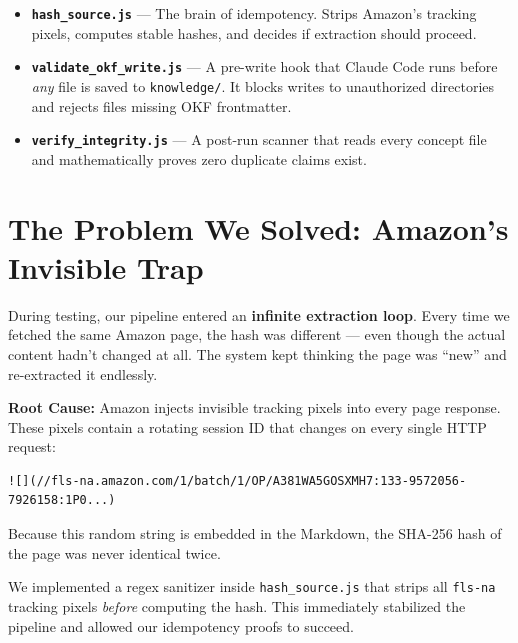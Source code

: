 \documentclass[11pt,a4paper]{article}
\begin{document}
\begin{itemize}[leftmargin=*, label=\textcolor{accent}{}]
    \item \textbf{\texttt{hash\_source.js}} --- The brain of idempotency. Strips Amazon's tracking pixels, computes stable hashes, and decides if extraction should proceed.
    \item \textbf{\texttt{validate\_okf\_write.js}} --- A pre-write hook that Claude Code runs before \textit{any} file is saved to \texttt{knowledge/}. It blocks writes to unauthorized directories and rejects files missing OKF frontmatter.
    \item \textbf{\texttt{verify\_integrity.js}} --- A post-run scanner that reads every concept file and mathematically proves zero duplicate claims exist.
\end{itemize}

\section{The Problem We Solved: Amazon's Invisible Trap}

\begin{dangerbox}
During testing, our pipeline entered an \textbf{infinite extraction loop}. Every time we fetched the same Amazon page, the hash was different --- even though the actual content hadn't changed at all. The system kept thinking the page was ``new'' and re-extracted it endlessly.
\end{dangerbox}

\textbf{Root Cause:} Amazon injects invisible tracking pixels into every page response. These pixels contain a rotating session ID that changes on every single HTTP request:

\begin{lstlisting}
![](//fls-na.amazon.com/1/batch/1/OP/A381WA5GOSXMH7:133-9572056-7926158:1P0...)
\end{lstlisting}

Because this random string is embedded in the Markdown, the SHA-256 hash of the page was never identical twice.

\begin{successbox}
We implemented a regex sanitizer inside \texttt{hash\_source.js} that strips all \texttt{fls-na} tracking pixels \textit{before} computing the hash. This immediately stabilized the pipeline and allowed our idempotency proofs to succeed.
\end{successbox}
\end{document}
